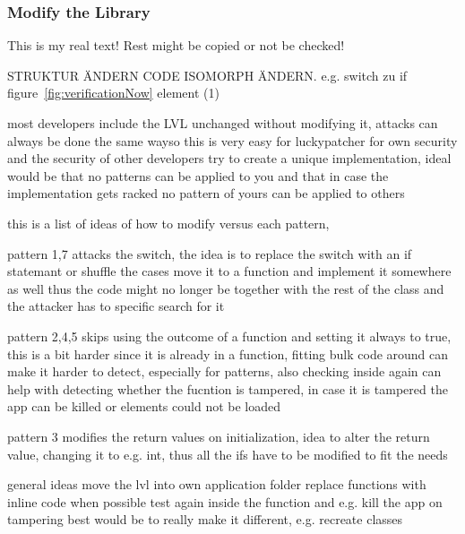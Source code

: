 \subsubsection{Modify the Library} \label{subsubsection:counter-modifications-library}
This is my real text! Rest might be copied or not be checked!

STRUKTUR ÄNDERN
CODE ISOMORPH ÄNDERN. e.g. switch zu if
figure~\ref{fig:verificationNow} element (1)

most developers include the LVL unchanged without modifying it, attacks can always be done the same wayso this is very easy for luckypatcher
for own security and the security of other developers try to create a unique implementation,
ideal would be that no patterns can be applied to you and that in case the implementation gets racked no pattern of yours can be applied to others

this is a list of ideas of how to modify versus each pattern,

pattern 1,7 attacks the switch, the idea is to replace the switch with an if statemant or shuffle the cases
move it to a function and implement it somewhere as well thus the code might no longer be together with the rest of the class and the attacker has to specific search for it

pattern 2,4,5 skips using the outcome of a function and setting it always to true, this is a bit harder since it is already in a function, fitting bulk code around can make it harder to detect, especially for patterns, also checking inside again can help with detecting whether the fucntion is tampered, in case it is tampered the app can be killed or elements could not be loaded

pattern 3 modifies the return values on initialization, idea to alter the return value, changing it to e.g. int, thus all the ifs have to be modified to fit the needs


general ideas
move the lvl into own application folder
replace functions with inline code when possible
test again inside the function and e.g. kill the app on tampering
best would be to really make it different, e.g. recreate classes
